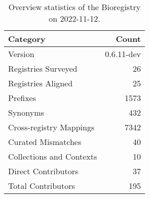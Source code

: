 \begin{table}
\centering
\caption{Overview statistics of the Bioregistry on 2022-11-12.}
\label{tab:bioregistry-summary}
\begin{tabular}{lr}
\toprule
                Category &      Count \\
\midrule
                 Version & 0.6.11-dev \\
     Registries Surveyed &         26 \\
      Registries Aligned &         25 \\
                Prefixes &       1573 \\
                Synonyms &        432 \\
 Cross-registry Mappings &       7342 \\
      Curated Mismatches &         40 \\
Collections and Contexts &         10 \\
     Direct Contributors &         37 \\
      Total Contributors &        195 \\
\bottomrule
\end{tabular}
\end{table}
